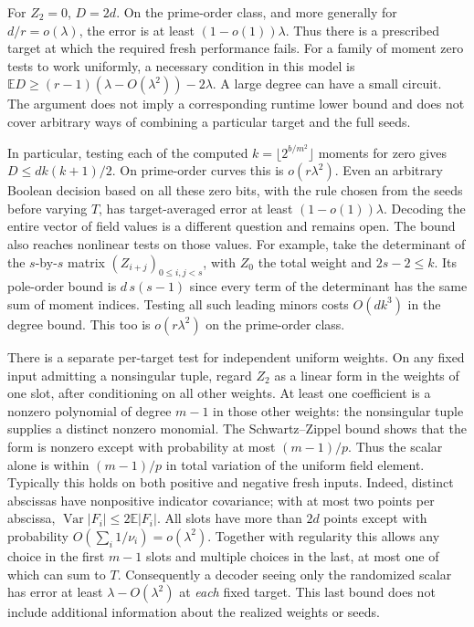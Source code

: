 \documentclass[11pt]{article}
\newcommand{\E}{\mathbb E}
\begin{document}
For $Z_2=0$, $D=2d$. On the prime-order class, and more generally for
$d/r=o(\lambda)$, the error is at least $(1-o(1))\lambda$. Thus there
is a prescribed target at which the required fresh performance fails.
For a family of moment zero tests to work uniformly, a necessary condition
in this model is $\E D\ge (r-1)(\lambda-O(\lambda^2))-2\lambda$.
A large degree can have a small circuit. The argument does not imply a
corresponding runtime lower bound and does not cover arbitrary ways of
combining a particular target and the full seeds.

In particular, testing each of the computed $k=\lfloor 2^{b/m^2}\rfloor$
moments for zero gives $D\le d k(k+1)/2$. On prime-order curves this is
$o(r\lambda^2)$. Even an arbitrary Boolean decision based on all these
zero bits, with the rule chosen from the seeds before varying $T$, has
target-averaged error at least $(1-o(1))\lambda$. Decoding the entire
vector of field values is a different question and remains open.
The bound also reaches nonlinear tests on those values. For example,
take the determinant of the $s$-by-$s$ matrix $(Z_{i+j})_{0\le i,j<s}$,
with $Z_0$ the total weight and $2s-2\le k$. Its pole-order bound is
$d\,s(s-1)$ since every term of the determinant has the same sum of
moment indices. Testing all such leading minors costs $O(dk^3)$ in the
degree bound. This too is $o(r\lambda^2)$ on the prime-order class.

There is a separate per-target test for independent uniform weights.
On any fixed input admitting a nonsingular tuple, regard $Z_2$ as a
linear form in the weights of one slot, after conditioning on all other
weights. At least one coefficient is a nonzero polynomial of degree
$m-1$ in those other weights: the nonsingular tuple supplies a distinct
nonzero monomial. The Schwartz--Zippel bound shows that the form is
nonzero except with probability at most $(m-1)/p$. Thus the scalar alone
is within $(m-1)/p$ in total variation of the uniform field element.
Typically this holds on both positive and negative fresh inputs.
Indeed, distinct abscissas have nonpositive indicator covariance;
with at most two points per abscissa,
$\operatorname{Var}|F_i|\le 2\E|F_i|$. All slots have more than $2d$
points except with probability $O(\sum_i1/\nu_i)=o(\lambda^2)$.
Together with regularity this allows any choice in the first $m-1$ slots
and multiple choices in the last, at most one of which can sum to $T$.
Consequently a decoder seeing only the randomized scalar has error at least
$\lambda-O(\lambda^2)$ at \emph{each} fixed target. This last bound does
not include additional information about the realized weights or seeds.
\end{document}
